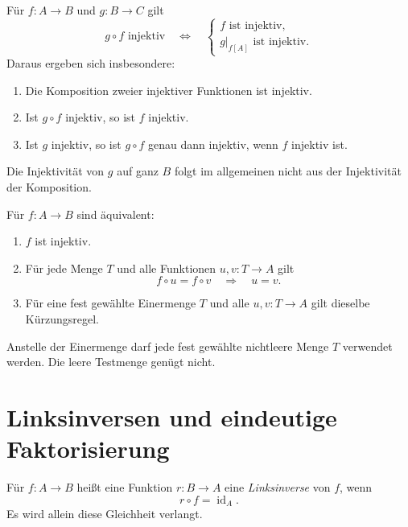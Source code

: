 \begin{theorem}
\label{b06guide:thm:composition}
Für $f\colon A\to B$ und $g\colon B\to C$ gilt
\[
 g\circ f\text{ injektiv}
 \quad\Longleftrightarrow\quad
 \left\{
 \begin{array}{l}
 f\text{ ist injektiv},\\
 g|_{f[A]}\text{ ist injektiv}.
 \end{array}\right.
\]
Daraus ergeben sich insbesondere:
\begin{enumerate}
\item Die Komposition zweier injektiver Funktionen ist injektiv.
\item Ist $g\circ f$ injektiv, so ist $f$ injektiv.
\item Ist $g$ injektiv, so ist $g\circ f$ genau dann injektiv,
      wenn $f$ injektiv ist.
\end{enumerate}
Die Injektivität von $g$ auf ganz $B$ folgt im allgemeinen
nicht aus der Injektivität der Komposition.
\end{theorem}

\begin{theorem}
\label{b06guide:thm:cancellation}
Für $f\colon A\to B$ sind äquivalent:
\begin{enumerate}
\item $f$ ist injektiv.
\item Für jede Menge $T$ und alle Funktionen $u,v\colon T\to A$ gilt
\[
 f\circ u=f\circ v\quad\Longrightarrow\quad u=v.
\]
\item Für eine fest gewählte Einermenge $T$ und alle
      $u,v\colon T\to A$ gilt dieselbe Kürzungsregel.
\end{enumerate}
Anstelle der Einermenge darf jede fest gewählte nichtleere Menge
$T$ verwendet werden. Die leere Testmenge genügt nicht.
\end{theorem}

\section{Linksinversen und eindeutige Faktorisierung}

\begin{definition}[Linksinverse]
Für $f\colon A\to B$ heißt eine Funktion $r\colon B\to A$
eine \emph{Linksinverse} von $f$, wenn
\[
 r\circ f=\operatorname{id}_A.
\]
Es wird allein diese Gleichheit verlangt.
\end{definition}

